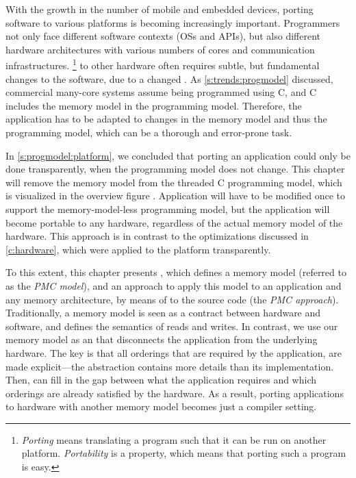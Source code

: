 With the growth in the number of mobile and embedded devices, porting software to various platforms is becoming increasingly important.
Programmers not only face different software contexts (\acp{OS} and \acp{API}), but also different hardware architectures with various numbers of cores and communication infrastructures.
\footnote{%
	\emph{Porting} means translating a program such that it can be run on another platform.
	\emph{Portability} is a property, which means that porting such a program is easy.
} to other hardware often requires subtle, but fundamental changes to the software, due to a changed .
As \cref{s:trends:progmodel} discussed, commercial many-core systems assume being programmed using C, and C includes the memory model in the programming model.
Therefore, the application has to be adapted to changes in the memory model and thus the programming model, which can be a thorough and error-prone task.

In \cref{s:progmodel:platform}, we concluded that porting an application could only be done transparently, when the programming model does not change.
This chapter will remove the memory model from the threaded C programming model, which is visualized in the overview figure \chapfigpageref.
Application will have to be modified once to support the memory-model-less programming model, but the application will become portable to any hardware, regardless of the actual memory model of the hardware.
This approach is in contrast to the optimizations discussed in \cref{c:hardware}, which were applied to the platform transparently.


To this extent, this chapter presents , which defines
a memory model (referred to as the \emph{\ac{PMC} model}), and
an approach to apply this model to an application and any memory architecture, by means of  to the source code (the \emph{\ac{PMC} approach}).
Traditionally, a memory model is seen as a contract between hardware and software, and defines the semantics of reads and writes.
In contrast, we use our memory model as an \emph{} that disconnects the application from the underlying hardware.
The key is that all orderings that are required by the application, are made explicit---the abstraction contains more details than its implementation.
Then,  can fill in the gap between what the application requires and which orderings are already satisfied by the hardware.
As a result, porting applications to hardware with another memory model becomes just a compiler setting.

